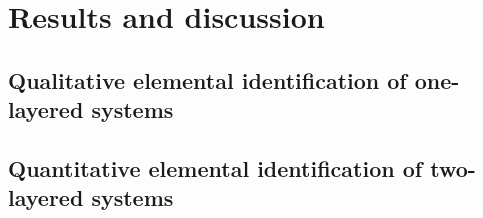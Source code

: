 


\chapter{Results and discussion} %

\label{Chapter4}



\section{Qualitative elemental identification of one-layered systems}


\section{Quantitative elemental identification of two-layered systems}


